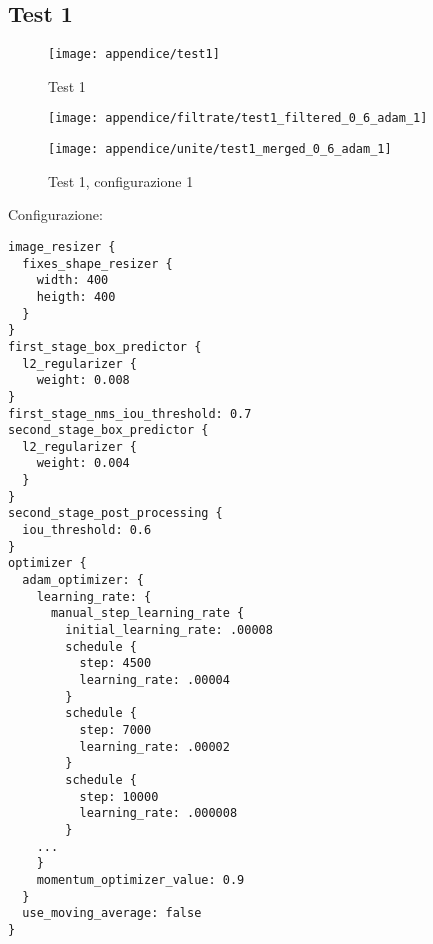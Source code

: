 \newpage
\subsection{Test 1}
\begin{figure}[!ht] 
    \centering
    \texttt{[image: appendice/test1]} 
    \caption{Test 1}
    \label{img:test-1}
\end{figure} 
\newpage



\begin{figure}[H]  
    \begin{minipage}{.5\columnwidth}  
        \centering  
        \texttt{[image: appendice/filtrate/test1\_filtered\_0\_6\_adam\_1]}  
    \end{minipage}%
    \begin{minipage}{0.5\columnwidth}  
        \centering  
        \texttt{[image: appendice/unite/test1\_merged\_0\_6\_adam\_1]}  
    \end{minipage}  
    \caption{Test 1, configurazione 1}
\end{figure}%
Configurazione:
\begin{multicols}{2}
    \begin{lstlisting}
image_resizer {
  fixes_shape_resizer {
    width: 400
    heigth: 400
  }
}
first_stage_box_predictor {
  l2_regularizer {
    weight: 0.008
}
first_stage_nms_iou_threshold: 0.7
second_stage_box_predictor {
  l2_regularizer {
    weight: 0.004
  }
}
second_stage_post_processing {
  iou_threshold: 0.6
}
optimizer {
  adam_optimizer: {
    learning_rate: {
      manual_step_learning_rate {
        initial_learning_rate: .00008
        schedule {
          step: 4500
          learning_rate: .00004
        }
        schedule {
          step: 7000
          learning_rate: .00002
        }
        schedule {
          step: 10000
          learning_rate: .000008
        }
    ...
    }
    momentum_optimizer_value: 0.9
  }
  use_moving_average: false
}
\end{lstlisting}
\end{multicols}

